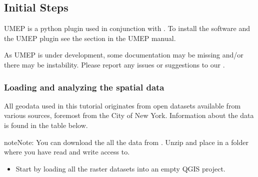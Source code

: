 \documentclass[letterpaper,10pt,english]{sphinxmanual}
\begin{document}
\subsection{Initial Steps}
\label{\detokenize{Tutorials/SuewsWUDAPT:initial-steps}}
UMEP is a python plugin used in conjunction with
. To install the software and the UMEP
plugin see the {\hyperref[\detokenize{Getting_Started:getting-started}]{}} section in the UMEP manual.

As UMEP is under development, some documentation may be missing and/or
there may be instability. Please report any issues or suggestions to our
.


\subsubsection{Loading and analyzing the spatial data}
\label{\detokenize{Tutorials/SuewsWUDAPT:loading-and-analyzing-the-spatial-data}}
All geodata used in this tutorial originates from open datasets available from various sources, foremost from the City of New York. Information about the data is found in the table below.

\begin{sphinxadmonition}{note}{Note:}
You can download the all the data from . Unzip and place in a folder where you have read and write access to.
\end{sphinxadmonition}
\begin{itemize}
\item {} 
Start by loading all the raster datasets into an empty QGIS project.

\end{itemize}
\end{document}
